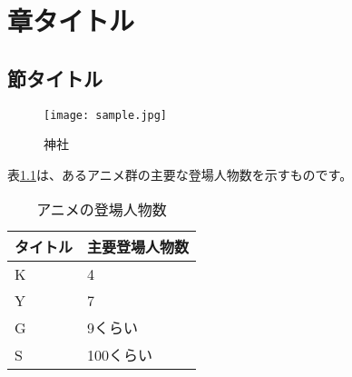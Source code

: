 \documentclass[_main]{subfiles}
\begin{document}
\chapter{章タイトル}
\section{節タイトル}

\begin{figure}
  \centering
  \texttt{[image: sample.jpg]}
  \caption{神社}
  \label{shrine}
\end{figure}

表\ref{charas}は、あるアニメ群の主要な登場人物数を示すものです。

\begin{table}[htbp]
\begin{center}
\caption{アニメの登場人物数}
\begin{tabular}{ll}
タイトル & 主要登場人物数\\ \hline
K & 4\\
Y & 7\\
G & 9くらい\\
S & 100くらい\\ \hline
\end{tabular}
\label{charas}
\end{center}
\end{table}
\end{document}
